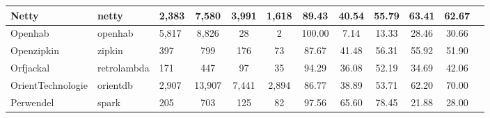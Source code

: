 \begin{table}
{\begin{tabular}{lllccccccccc}
Netty                       & netty                                                         & 2,383           & 7,580            & 3,991                                                            & 1,618          & 89.43          & 40.54          & 55.79          & 63.41                                                             & 62.67                                                              \\ \hline
Openhab                     & openhab                                                       & 5,817           & 8,826            & 28                                                               & 2              & 100.00         & 7.14           & 13.33          & 28.46                                                             & 30.66                                                              \\ \hline
Openzipkin                  & zipkin                                                        & 397             & 799              & 176                                                              & 73             & 87.67          & 41.48          & 56.31          & 55.92                                                             & 51.90                                                              \\ \hline
Orfjackal                   & retrolambda                                                   & 171             & 447              & 97                                                               & 35             & 94.29          & 36.08          & 52.19          & 34.69                                                             & 42.06                                                              \\ \hline
OrientTechnologie           & orientdb                                                      & 2,907           & 13,907           & 7,441                                                            & 2,894          & 86.77          & 38.89          & 53.71          & 62.20                                                             & 70.00                                                              \\ \hline
Perwendel                   & spark                                                         & 205             & 703              & 125                                                              & 82             & 97.56          & 65.60          & 78.45          & 21.88                                                             & 28.00                                                              \\ \hline

\end{tabular}}
\end{table}
